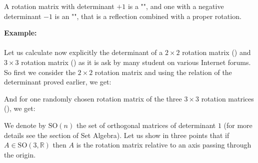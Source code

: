 	A rotation matrix with determinant $+1$ is a "", and one with a negative determinant $-1$ is an "", that is a reflection combined with a proper rotation.
	
	\pagebreak
	\begin{tcolorbox}[colframe=black,colback=white,sharp corners]
	\textbf{{\Large {}}Example:}\\\\
	Let us calculate now explicitly the determinant of a $2\times 2$ rotation matrix () and $3\times 3$ rotation matrix () as it is ask by many student on various Internet forums.\\

	So first we consider the $2\times 2$ rotation matrix and using the relation of the determinant proved earlier, we get:
	
	And for one randomly chosen rotation matrix of the three $3\times 3$ rotation matrices (), we get:
		
	\end{tcolorbox}
	
	We denote by $\text{SO}(n)$ the set of orthogonal matrices of determinant $1$ (for more details see the section of Set Algebra). Let us show in three points that if $A\in \text{SO}(3,\mathbb{R})$  then $A$ is the rotation matrix relative to an axis passing through the origin.
	
